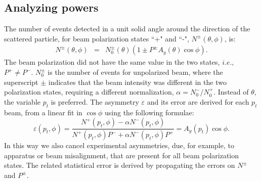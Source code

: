 \documentclass[epj]{svjour}
\newcommand\ba{\begin{eqnarray}}
\newcommand\ea{\end{eqnarray}}
\newcommand{\be}{\begin{equation}}
\newcommand{\ee}{\end{equation}}
\begin{document}
\subsection{Analyzing powers}
The number of events detected in a unit solid angle around the direction of the scattered particle,  for beam polarization states ``+" and ``-", $N^{\pm}(\theta, \phi)$, is:
\ba
N^{\pm} (\theta, \phi)&=& N_{0}^{\pm}(\theta) (1\pm P^{\pm} A_{y}(\theta)\cos\phi).
\ea
The beam polarization did not have the same value  in the two states, $i.e.,$ 
$P^{+} \neq P^{-} $.  $N_{0}^{\pm}$ is the number of events for unpolarized beam, where the superscript ${\pm}$ indicates  that the beam intensity was different in the two polarization states, requiring a different normalization, $\alpha=N_{0}^-/N_{0}^+$.
Instead of $\theta$, the variable $p_t$ is preferred. 
The asymmetry $\varepsilon$ and its error are derived for each $p_t$ beam, from a linear fit in $\cos\phi $
using  the following formulae:
\be
\varepsilon(p_t,\phi)=  \displaystyle\frac{N^+(p_t,\phi)- \alpha N^-(p_t,\phi)}
{N^+(p_t,\phi)P^- + \alpha N^-(p_t,\phi) P^+ }=A_{y}(p_t) \cos\phi . 
\label{Eq:Asym}
\ee
In this way we also cancel experimental asymmetries, due, for example, to apparatus or beam misalignment, that are present for all beam polarization states. The related statistical error is derived by propagating the errors on $N^\pm$ and $P^\pm$. 
\end{document}
